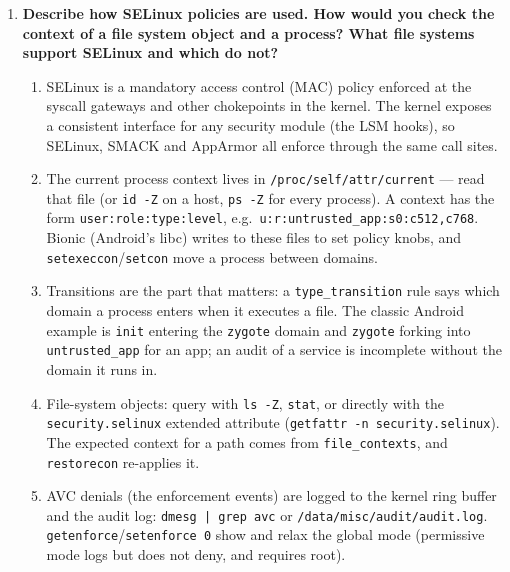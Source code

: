 \documentclass[12pt]{Training}
\begin{document}
\begin{enumerate}
\begin{enumerate}
        \item Android specifics: SELinux gates \lstinline{ptrace} between domains, so a normal \lstinline{untrusted_app} cannot attach to another app or to \lstinline{system_server}. The practical routes are a \lstinline{userdebug}/\lstinline{eng} build with \lstinline{adb root}, a debuggable application (\lstinline{android:debuggable="true"}), or the \lstinline{run-as} path for a debuggable package. \lstinline{adbd} running as \lstinline{shell} can attach to processes the \lstinline{shell} domain is allowed to reach, which is why \lstinline{gdbserver} is started as root in the standard recipe below.
    \end{enumerate}
    \item \textbf{Describe how SELinux policies are used. How would you check the context of a file system object and a process? What file systems support SELinux and which do not?}
    \begin{enumerate}
        \item SELinux is a mandatory access control (MAC) policy enforced at the syscall gateways and other chokepoints in the kernel. The kernel exposes a consistent interface for any security module (the LSM hooks), so SELinux, SMACK and AppArmor all enforce through the same call sites.
        \item The current process context lives in \lstinline{/proc/self/attr/current} --- read that file (or \lstinline{id -Z} on a host, \lstinline{ps -Z} for every process). A context has the form \lstinline{user:role:type:level}, e.g.\ \lstinline{u:r:untrusted_app:s0:c512,c768}. Bionic (Android's libc) writes to these files to set policy knobs, and \lstinline{setexeccon}/\lstinline{setcon} move a process between domains.
        \item Transitions are the part that matters: a \lstinline{type_transition} rule says which domain a process enters when it executes a file. The classic Android example is \lstinline{init} entering the \lstinline{zygote} domain and \lstinline{zygote} forking into \lstinline{untrusted_app} for an app; an audit of a service is incomplete without the domain it runs in.
        \item File-system objects: query with \lstinline{ls -Z}, \lstinline{stat}, or directly with the \lstinline{security.selinux} extended attribute (\lstinline{getfattr -n security.selinux}). The expected context for a path comes from \lstinline{file_contexts}, and \lstinline{restorecon} re-applies it.
        \item AVC denials (the enforcement events) are logged to the kernel ring buffer and the audit log: \lstinline{dmesg | grep avc} or \lstinline{/data/misc/audit/audit.log}. \lstinline{getenforce}/\lstinline{setenforce 0} show and relax the global mode (permissive mode logs but does not deny, and requires root).

\end{enumerate}
\end{enumerate}
\end{document}
